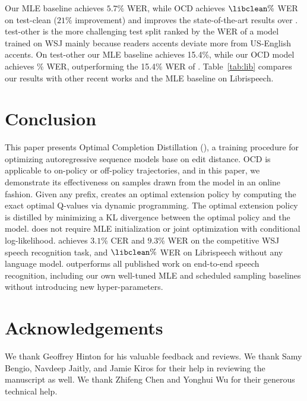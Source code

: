  Our MLE baseline achieves $5.7\%$ WER, while OCD achieves $\libclean\%$ WER on test-clean ($21\%$ improvement) and improves the state-of-the-art results over \cite{zeyer2018improved}.   test-other is the more challenging test split ranked by the WER of a model trained on WSJ \citep{librispeech} mainly because readers accents deviate more from US-English accents. On test-other our MLE baseline achieves 15.4\%, while our OCD model achieves \libother\% WER, outperforming the 15.4\% WER of \cite{zeyer2018improved}. Table~\ref{tab:lib} compares our results with other recent works and the MLE baseline on Librispeech. 

\section{Conclusion}
\label{sec:conclusion}
This paper presents Optimal Completion Distillation (\acronym), a training procedure for optimizing autoregressive sequence models
base on edit distance. OCD is applicable to on-policy or off-policy trajectories, and in this paper,
we demonstrate its effectiveness on samples drawn from the model in an online fashion.
Given any prefix, \acronym creates an optimal extension policy by computing the exact optimal Q-values via dynamic programming.
The optimal extension policy is distilled by minimizing a KL divergence between the optimal policy and the model.
\acronym does not require MLE initialization or joint optimization with conditional log-likelihood.
\acronym achieves $3.1$\% CER and $9.3$\% WER on the competitive WSJ speech recognition task, and $\libclean\%$ WER on Librispeech
without any language model.
\acronym outperforms all published work on end-to-end speech recognition, including our own well-tuned MLE and scheduled sampling baselines
without introducing new hyper-parameters.

\ifarxiv 
\section*{Acknowledgements}
We thank Geoffrey Hinton for his valuable feedback and reviews. We thank Samy Bengio, Navdeep Jaitly,
and Jamie Kiros for their help in reviewing the manuscript as well. We thank Zhifeng Chen and
Yonghui Wu for their generous technical help. \else
 \ificlrfinal
